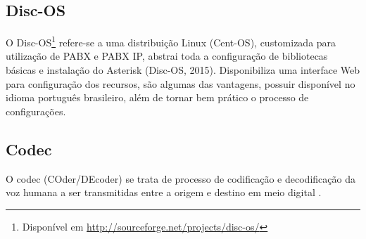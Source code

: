 \subsection{Disc-OS}
O Disc-OS\footnote{Disponível em \url{http://sourceforge.net/projects/disc-os/}} refere-se a uma distribuição Linux (Cent-OS), customizada para utilização de PABX e PABX IP, abstrai toda a configuração de bibliotecas básicas e instalação do Asterisk (Disc-OS, 2015). Disponibiliza uma interface Web para configuração dos recursos, são algumas das vantagens, possuir disponível no idioma português brasileiro, além de tornar bem prático o processo de configurações.

\subsection{Codec}
O codec (COder/DEcoder) se trata de processo de codificação e decodificação da voz humana a ser transmitidas entre a origem e destino em meio digital \cite{VIEIRA:2007}.